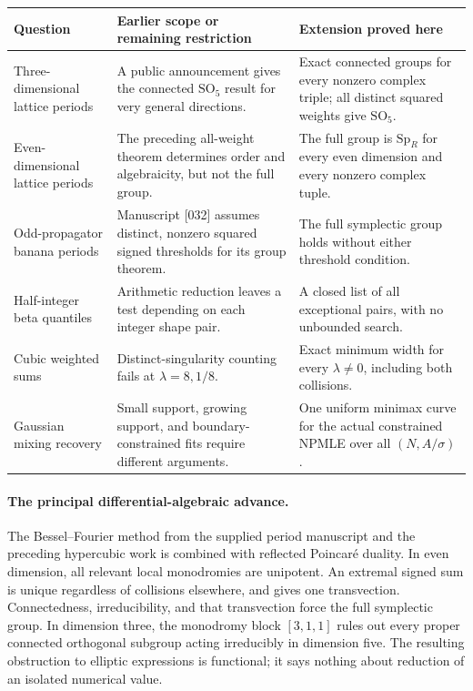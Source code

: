 \documentclass[11pt,a4paper]{article}
\theoremstyle{definition}
\theoremstyle{remark}
\numberwithin{equation}{section}
\begin{document}
\begin{center}
\small
\renewcommand{\arraystretch}{1.25}
\begin{tabular}{>{\raggedright\arraybackslash}p{}
                >{\raggedright\arraybackslash}p{}
                >{\raggedright\arraybackslash}p{}}
\toprule
Question & Earlier scope or remaining restriction & Extension proved here\\
\midrule
Three-dimensional lattice periods & A public announcement gives the
connected $\mathrm{SO}_5$ result for very general directions.
& Exact connected groups for every nonzero complex triple;
all distinct squared weights give $\mathrm{SO}_5$.\\
Even-dimensional lattice periods & The preceding all-weight theorem
determines order and algebraicity, but not the full group.
& The full group is $\mathrm{Sp}_R$ for every even dimension
and every nonzero complex tuple.\\
Odd-propagator banana periods & Manuscript [032] assumes distinct,
nonzero squared signed thresholds for its group theorem.
& The full symplectic group holds without either threshold condition.\\
Half-integer beta quantiles & Arithmetic reduction leaves a test
depending on each integer shape pair.
& A closed list of all exceptional pairs, with no unbounded search.\\
Cubic weighted sums & Distinct-singularity counting fails at
$\lambda=8,1/8$.
& Exact minimum width for every $\lambda\ne0$, including both collisions.\\
Gaussian mixing recovery & Small support, growing support, and
boundary-constrained fits require different arguments.
& One uniform minimax curve for the actual constrained NPMLE
over all $(N,A/\sigma)$.\\
\bottomrule
\end{tabular}
\end{center}

\paragraph{The principal differential-algebraic advance.}
The Bessel--Fourier method from the supplied period manuscript
\cite{p5:Keio032} and the preceding hypercubic work is combined with
reflected Poincar\'e duality. In even dimension, all relevant local
monodromies are unipotent. An extremal signed sum is unique regardless
of collisions elsewhere, and gives one transvection. Connectedness,
irreducibility, and that transvection force the full symplectic group.
In dimension three, the monodromy block $[3,1,1]$ rules out every
proper connected orthogonal subgroup acting irreducibly in dimension
five. The resulting obstruction to elliptic expressions is functional;
it says nothing about reduction of an isolated numerical value.
\end{document}
